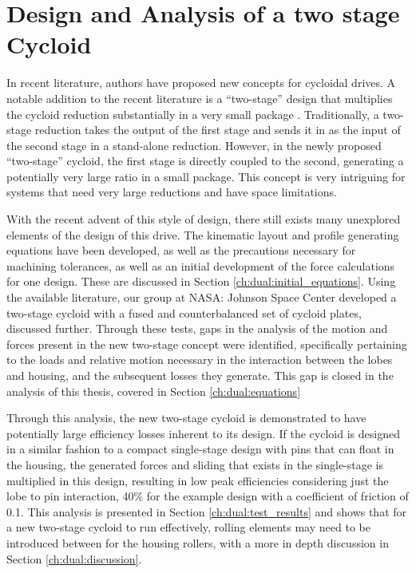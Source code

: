 
\chapter{Design and Analysis of a two stage Cycloid}\label{ch:dual}

In recent literature, authors have proposed new concepts for cycloidal drives. A notable addition to the recent literature is a ``two-stage'' design that multiplies the cycloid reduction substantially in a very small package \cite{ref:new_two_stage}. Traditionally, a two-stage reduction takes the output of the first stage and sends it in as the input of the second stage in a stand-alone reduction. However, in the newly proposed ``two-stage'' cycloid, the first stage is directly coupled to the second, generating a potentially very large ratio in a small package. This concept is very intriguing for systems that need very large reductions and have space limitations. 

With the recent advent of this style of design, there still exists many unexplored elements of the design of this drive. The kinematic layout and profile generating equations have been developed, as well as the precautions necessary for machining tolerances, as well as an initial development of the force calculations for one design. These are discussed in Section \ref{ch:dual:initial_equations}. Using the available literature, our group at NASA: Johnson Space Center developed a two-stage cycloid with a fused and counterbalanced set of cycloid plates, discussed further. Through these tests, gaps in the analysis of the motion and forces present in the new two-stage concept were identified, specifically pertaining to the loads and relative motion necessary in the interaction between the lobes and housing, and the subsequent losses they generate. This gap is closed in the analysis of this thesis, covered in Section \ref{ch:dual:equations}


Through this analysis, the new two-stage cycloid is demonstrated to have potentially large efficiency losses inherent to its design. If the cycloid is designed in a similar fashion to a compact single-stage design with pins that can float in the housing, the generated forces and sliding that exists in the single-stage is multiplied in this design, resulting in low peak efficiencies considering just the lobe to pin interaction, 40\% for the example design with a coefficient of friction of 0.1. This analysis is presented in Section \ref{ch:dual:test_results} and shows that for a new two-stage cycloid to run effectively, rolling elements may need to be introduced between for the housing rollers, with a more in depth discussion in Section \ref{ch:dual:discussion}.

